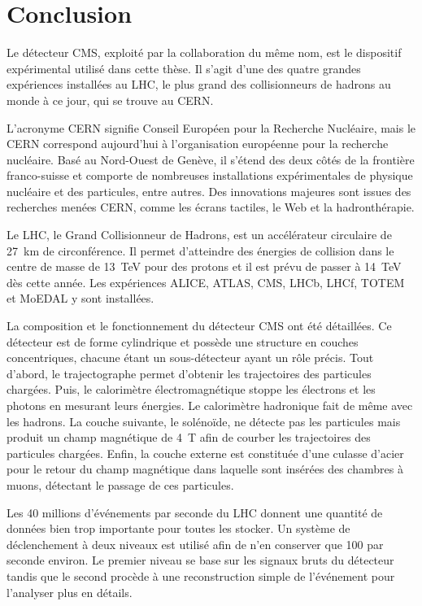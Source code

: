\section{Conclusion}\label{chapter-LHC-section-conclusion}
Le détecteur CMS, exploité par la collaboration du même nom, est le dispositif expérimental utilisé dans cette thèse.
Il s'agit d'une des quatre grandes expériences installées au LHC, le plus grand des collisionneurs de hadrons au monde à ce jour, qui se trouve au CERN.
\par L'acronyme \og CERN \fg{} signifie Conseil Européen pour la Recherche Nucléaire, mais le CERN correspond aujourd'hui à l'organisation européenne pour la recherche nucléaire.
Basé au Nord-Ouest de Genève, il s'étend des deux côtés de la frontière franco-suisse et comporte de nombreuses installations expérimentales de physique nucléaire et des particules, entre autres.
Des innovations majeures sont issues des recherches menées CERN, comme les écrans tactiles, le Web et la hadronthérapie.
\par Le LHC, le Grand Collisionneur de Hadrons, est un accélérateur circulaire de \SI{27}{\kilo\meter} de circonférence.
Il permet d'atteindre des énergies de collision dans le centre de masse de \SI{13}{\TeV} pour des protons et il est prévu de passer à \SI{14}{\TeV} dès cette année.
Les expériences ALICE, ATLAS, CMS, LHCb, LHCf, TOTEM et MoEDAL y sont installées.
\par La composition et le fonctionnement du détecteur CMS ont été détaillées.
Ce détecteur est de forme cylindrique et possède une structure en couches concentriques, chacune étant un sous-détecteur ayant un rôle précis.
Tout d'abord, le trajectographe permet d'obtenir les trajectoires des particules chargées.
Puis, le calorimètre électromagnétique stoppe les électrons et les photons en mesurant leurs énergies.
Le calorimètre hadronique fait de même avec les hadrons.
La couche suivante, le solénoïde, ne détecte pas les particules mais produit un champ magnétique de \SI{4}{\tesla} afin de courber les trajectoires des particules chargées.
Enfin, la couche externe est constituée d'une culasse d'acier pour le retour du champ magnétique dans laquelle sont insérées des chambres à muons, détectant le passage de ces particules.
\par Les 40 millions d'événements par seconde du LHC donnent une quantité de données bien trop importante pour toutes les stocker.
Un système de déclenchement à deux niveaux est utilisé afin de n'en conserver que 100 par seconde environ.
Le premier niveau se base sur les signaux bruts du détecteur tandis que le second procède à une reconstruction simple de l'événement pour l'analyser plus en détails.
